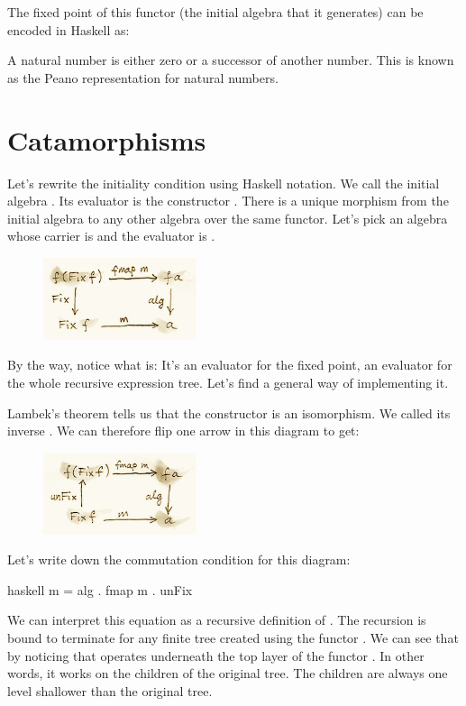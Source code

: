 The fixed point of this functor (the initial algebra that it generates)
can be encoded in Haskell as:

A natural number is either zero or a successor of another number. This
is known as the Peano representation for natural numbers.

\section{Catamorphisms}

Let's rewrite the initiality condition using Haskell notation. We call
the initial algebra . Its evaluator is the constructor
. There is a unique morphism  from the initial
algebra to any other algebra over the same functor. Let's pick an
algebra whose carrier is  and the evaluator is .

\begin{figure}[H]
\centering
\includegraphics[width=0.4\textwidth]{images/alg5.png}
\end{figure}

\noindent
By the way, notice what  is: It's an evaluator for the fixed
point, an evaluator for the whole recursive expression tree. Let's find
a general way of implementing it.

Lambek's theorem tells us that the constructor  is an
isomorphism. We called its inverse . We can therefore flip
one arrow in this diagram to get:

\begin{figure}[H]
\centering
\includegraphics[width=0.4\textwidth]{images/alg6.png}
\end{figure}

\noindent
Let's write down the commutation condition for this diagram:

\begin{snip}{haskell}
m = alg . fmap m . unFix
\end{snip}
We can interpret this equation as a recursive definition of .
The recursion is bound to terminate for any finite tree created using
the functor . We can see that by noticing that
 operates underneath the top layer of the functor
. In other words, it works on the children of the original
tree. The children are always one level shallower than the original
tree.

